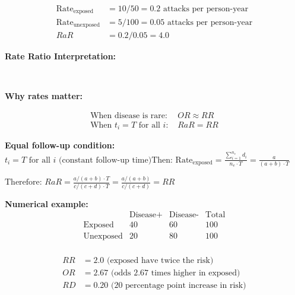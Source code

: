 \documentclass{article}
\begin{document}
\begin{align}
\text{Rate}_{\text{exposed}} &= 10/50 = 0.2 \text{ attacks per person-year} \\
\text{Rate}_{\text{unexposed}} &= 5/100 = 0.05 \text{ attacks per person-year} \\
RaR &= 0.2/0.05 = 4.0
\end{align}

\textbf{Rate Ratio Interpretation:}
 \\

 \\

\textbf{Why rates matter:}  \\

\begin{align}
\text{When disease is rare: } &OR \approx RR \\
\text{When } t_i = T \text{ for all } i\text{: } &RaR = RR
\end{align}

\textbf{Equal follow-up condition:}
$t_i = T \text{ for all } i \text{ (constant follow-up time)}
\text{Then: } \text{Rate}_{\text{exposed}} = \frac{\sum_{i=1}^{n_e} d_i}{n_e \cdot T} = \frac{a}{(a+b) \cdot T}$

$\text{Therefore: } RaR = \frac{a/(a+b) \cdot T}{c/(c+d) \cdot T} = \frac{a/(a+b)}{c/(c+d)} = RR$

\textbf{Numerical example:}
$$\begin{array}{c|cc|c}
& \text{Disease+} & \text{Disease-} & \text{Total} \\
\hline
\text{Exposed} & 40 & 60 & 100 \\
\text{Unexposed} & 20 & 80 & 100 \\
\end{array}$$

\begin{align}
RR &= 2.0 \text{ (exposed have twice the risk)} \\
OR &= 2.67 \text{ (odds 2.67 times higher in exposed)} \\
RD &= 0.20 \text{ (20 percentage point increase in risk)}
\end{align}
\end{document}
